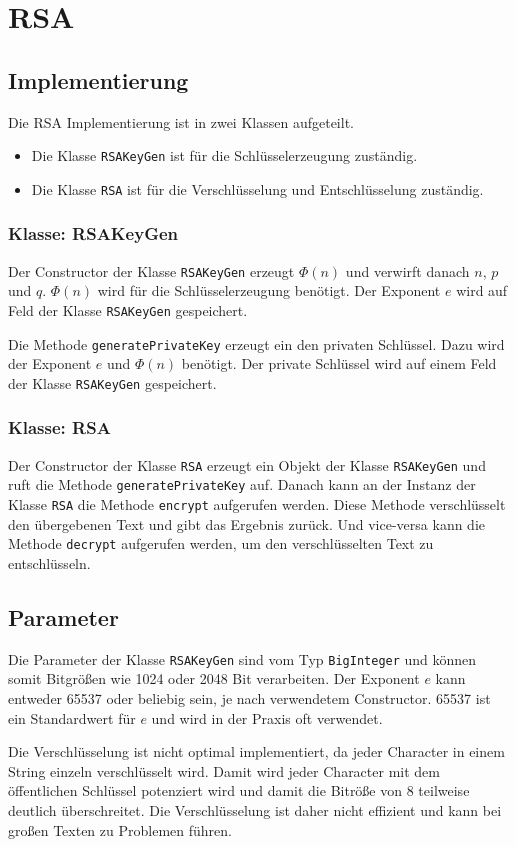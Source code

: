 \chapter{RSA}
\label{chap:back}

\section{Implementierung}
Die RSA Implementierung ist in zwei Klassen aufgeteilt.
\begin{itemize}
	\item Die Klasse \texttt{RSAKeyGen} ist für die Schlüsselerzeugung zuständig.
	\item Die Klasse \texttt{RSA} ist für die Verschlüsselung und Entschlüsselung zuständig.
\end{itemize}

\subsection{Klasse: RSAKeyGen}
Der Constructor der Klasse \texttt{RSAKeyGen} erzeugt $\Phi(n)$ und verwirft danach $n$, $p$ und $q$. $\Phi(n)$ wird für die Schlüsselerzeugung benötigt. Der Exponent $e$ wird auf Feld der Klasse \texttt{RSAKeyGen} gespeichert.

Die Methode \texttt{generatePrivateKey} erzeugt ein den privaten Schlüssel. Dazu wird der Exponent $e$ und $\Phi(n)$ benötigt. Der private Schlüssel wird auf einem Feld der Klasse \texttt{RSAKeyGen} gespeichert.

\subsection{Klasse: RSA}
Der Constructor der Klasse \texttt{RSA} erzeugt ein Objekt der Klasse \texttt{RSAKeyGen} und ruft die Methode \texttt{generatePrivateKey} auf.
Danach kann an der Instanz der Klasse \texttt{RSA} die Methode \texttt{encrypt} aufgerufen werden. Diese Methode verschlüsselt den übergebenen Text und gibt das Ergebnis zurück.
Und vice-versa kann die Methode \texttt{decrypt} aufgerufen werden, um den verschlüsselten Text zu entschlüsseln.

\section{Parameter}
Die Parameter der Klasse \texttt{RSAKeyGen} sind vom Typ \texttt{BigInteger} und können somit Bitgrößen wie 1024 oder 2048 Bit verarbeiten. Der Exponent $e$ kann entweder 65537 oder beliebig sein, je nach verwendetem Constructor. 65537 ist ein Standardwert für $e$ und wird in der Praxis oft verwendet.

Die Verschlüsselung ist nicht optimal implementiert, da jeder Character in einem String einzeln verschlüsselt wird. Damit wird jeder Character mit dem öffentlichen Schlüssel potenziert wird und damit die Bitröße von 8 teilweise deutlich überschreitet. Die Verschlüsselung ist daher nicht effizient und kann bei großen Texten zu Problemen führen.